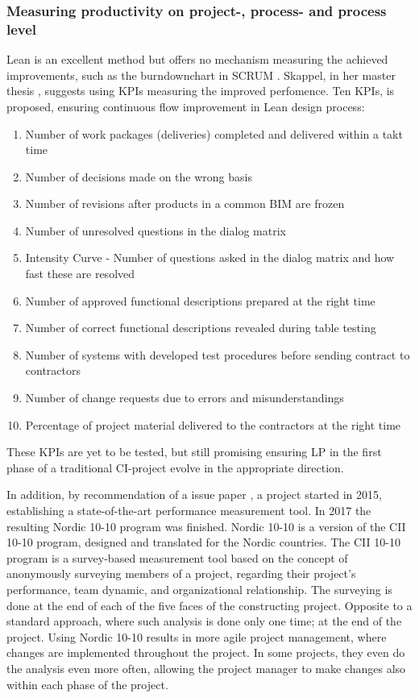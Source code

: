 \subsubsection{Measuring productivity on project-, process- and process level}
Lean is an excellent method but offers no mechanism measuring the achieved improvements, such as the burndownchart in SCRUM \cite{sutherland}. Skappel, in her master thesis \cite{KPIs_in_lean}, suggests using KPIs measuring the improved perfomence. Ten KPIs, is proposed, ensuring continuous flow improvement in Lean design process: 
\begin{enumerate}
    \item Number of work packages (deliveries) completed and delivered within a takt time
    \item  Number of decisions made on the wrong basis
    \item  Number of revisions after products in a common BIM are frozen
    \item  Number of unresolved questions in the dialog matrix
    \item  Intensity Curve - Number of questions asked in the dialog matrix and how fast these are
    resolved
    \item  Number of approved functional descriptions prepared at the right time
    \item  Number of correct functional descriptions revealed during table testing
    \item  Number of systems with developed test procedures before sending contract to contractors
    \item  Number of change requests due to errors and misunderstandings
    \item  Percentage of project material delivered to the contractors at the right time
\end{enumerate}
These KPIs are yet to be tested, but still promising ensuring LP in the first phase of a traditional CI-project evolve in the appropriate direction. 

In addition, by recommendation of a issue paper \cite{langlo2013maaling}, a project started in 2015, establishing a state-of-the-art performance measurement tool. In 2017 the resulting Nordic 10-10 \cite{nordic-10-10} program was finished. Nordic 10-10 is a version of the CII 10-10 program\cite{CII-10-10}, designed and translated for the Nordic countries. The CII 10-10 program is a survey-based measurement tool based on the concept of anonymously surveying members of a project, regarding their project's performance, team dynamic, and organizational relationship. The surveying is done at the end of each of the five faces of the constructing project. Opposite to a standard approach, where such analysis is done only one time; at the end of the project. Using Nordic 10-10 results in more agile project management, where changes are implemented throughout the project. In some projects, they even do the analysis even more often, allowing the project manager to make changes also within each phase of the project. 

